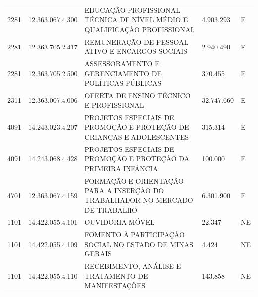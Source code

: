 \documentclass{article}
\begin{document}
\begin{longtable}[c]{m{1cm}|m{2cm}|m{10cm}|m{2cm}|m{1cm}}
\multicolumn{1}{C{1cm}|}{2281} & \multicolumn{1}{C{2cm}|}{12.363.067.4.300} & \multicolumn{1}{L{10cm}|}{EDUCAÇÃO PROFISSIONAL TÉCNICA DE NÍVEL MÉDIO E QUALIFICAÇÃO PROFISSIONAL} & \multicolumn{1}{R{2cm}|}{4.903.293} & \multicolumn{1}{C{1cm}}{E} \\
\multicolumn{1}{C{1cm}|}{2281} & \multicolumn{1}{C{2cm}|}{12.363.705.2.417} & \multicolumn{1}{L{10cm}|}{REMUNERAÇÃO DE PESSOAL ATIVO E ENCARGOS SOCIAIS} & \multicolumn{1}{R{2cm}|}{2.940.490} & \multicolumn{1}{C{1cm}}{E} \\
\multicolumn{1}{C{1cm}|}{2281} & \multicolumn{1}{C{2cm}|}{12.363.705.2.500} & \multicolumn{1}{L{10cm}|}{ASSESSORAMENTO E GERENCIAMENTO DE POLÍTICAS PÚBLICAS} & \multicolumn{1}{R{2cm}|}{370.455} & \multicolumn{1}{C{1cm}}{E} \\
\multicolumn{1}{C{1cm}|}{2311} & \multicolumn{1}{C{2cm}|}{12.363.007.4.006} & \multicolumn{1}{L{10cm}|}{OFERTA DE ENSINO TÉCNICO E PROFISSIONAL} & \multicolumn{1}{R{2cm}|}{32.747.660} & \multicolumn{1}{C{1cm}}{E} \\
\multicolumn{1}{C{1cm}|}{4091} & \multicolumn{1}{C{2cm}|}{14.243.023.4.207} & \multicolumn{1}{L{10cm}|}{PROJETOS ESPECIAIS DE PROMOÇÃO E PROTEÇÃO DE CRIANÇAS E ADOLESCENTES} & \multicolumn{1}{R{2cm}|}{315.314} & \multicolumn{1}{C{1cm}}{E} \\
\multicolumn{1}{C{1cm}|}{4091} & \multicolumn{1}{C{2cm}|}{14.243.068.4.428} & \multicolumn{1}{L{10cm}|}{PROJETOS ESPECIAIS DE PROMOÇÃO E PROTEÇÃO DA PRIMEIRA INFÂNCIA} & \multicolumn{1}{R{2cm}|}{100.000} & \multicolumn{1}{C{1cm}}{E} \\
\multicolumn{1}{C{1cm}|}{4701} & \multicolumn{1}{C{2cm}|}{12.363.067.4.159} & \multicolumn{1}{L{10cm}|}{FORMAÇÃO E ORIENTAÇÃO PARA A INSERÇÃO DO TRABALHADOR NO MERCADO DE TRABALHO} & \multicolumn{1}{R{2cm}|}{6.301.900} & \multicolumn{1}{C{1cm}}{E} \\
\multicolumn{1}{C{1cm}|}{1101} & \multicolumn{1}{C{2cm}|}{14.422.055.4.101} & \multicolumn{1}{L{10cm}|}{OUVIDORIA MÓVEL} & \multicolumn{1}{R{2cm}|}{22.347} & \multicolumn{1}{C{1cm}}{NE} \\
\multicolumn{1}{C{1cm}|}{1101} & \multicolumn{1}{C{2cm}|}{14.422.055.4.109} & \multicolumn{1}{L{10cm}|}{FOMENTO À PARTICIPAÇÃO SOCIAL NO ESTADO DE MINAS GERAIS} & \multicolumn{1}{R{2cm}|}{4.424} & \multicolumn{1}{C{1cm}}{NE} \\
\multicolumn{1}{C{1cm}|}{1101} & \multicolumn{1}{C{2cm}|}{14.422.055.4.110} & \multicolumn{1}{L{10cm}|}{RECEBIMENTO, ANÁLISE E TRATAMENTO DE MANIFESTAÇÕES} & \multicolumn{1}{R{2cm}|}{143.858} & \multicolumn{1}{C{1cm}}{NE} \\

\end{longtable}
\end{document}
